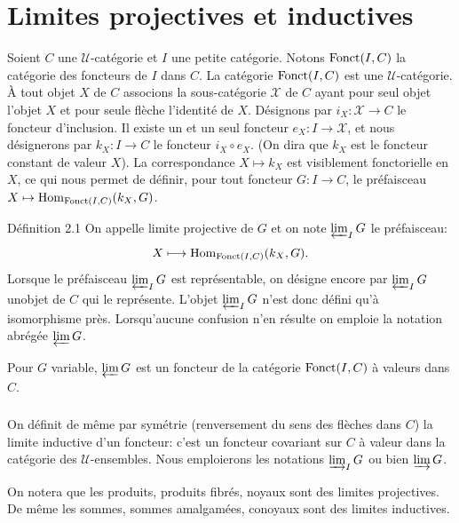 \documentclass[10pt]{../fichiers-configuration-latex/smfart}
\begin{document}
\section{Limites projectives et inductives}

Soient $C$ une $𝒰$-catégorie et $I$ une petite catégorie.
Notons $\operatorname{Fonct}(I,C)$ la catégorie des foncteurs de $I$ dans $C$. La
catégorie $\operatorname{Fonct}(I,C)$ est une $𝒰$-catégorie. À tout objet
$X$ de $C$ associons la sous-catégorie $𝒳$ de $C$ ayant pour
seul objet l'objet $X$ et pour seule flèche l'identité de $X$.
Désignons par $i_X:𝒳\rightarrow C$ le foncteur d'inclusion.
Il existe un et un seul foncteur $e_X:I\rightarrow 𝒳$, et
nous désignerons par $k_X:I\rightarrow C$ le foncteur $i_X\circ
e_X$. (On dira que $k_X$ est le foncteur constant de valeur $X$). La
correspondance $X\mapsto k_X$ est visiblement fonctorielle en $X$,
ce qui nous permet de définir, pour tout foncteur $G:I\rightarrow
C$, le préfaisceau $X\mapsto \operatorname{Hom}_{\operatorname{Fonct}(I,C)}(k_X,G)$.

\begin{enonce*}{Définition 2.1}
On appelle limite projective de $G$ et on note $\varprojlim_I G$ le
préfaisceau:
$$
X\longmapsto \operatorname{Hom}_{\operatorname{Fonct}(I,C)}(k_X,G){}.
$$
Lorsque le préfaisceau $\varprojlim_I G$ est représentable, on
désigne encore par $\varprojlim_I G$ un\pageoriginale objet de $C$
qui le représente. L'objet $\varprojlim_I G$ n'est donc défini qu'à
isomorphisme près. Lorsqu'aucune confusion n'en résulte on emploie
la notation abrégée $\varprojlim G$.
\end{enonce*}

Pour $G$ variable, $\varprojlim G$ est un foncteur de la catégorie
$\operatorname{Fonct}(I,C)$ à valeurs dans $\widehat{C}$.

\setcounter{subsection}{1} \setcounter{subsubsection}{0}
\subsubsection{}
On définit de même par symétrie (renversement du sens des flèches
dans $C$) la limite inductive d'un foncteur: c'est un foncteur
covariant sur $C$ à valeur dans la catégorie des
$𝒰$-ensembles. Nous emploierons les notations $\varinjlim_I
G$ ou bien $\varinjlim G$.

On notera que les produits, produits fibrés, noyaux sont des limites
projectives. De même les sommes, sommes amalgamées, conoyaux sont
des %
limites inductives.
\end{document}
